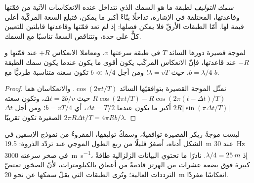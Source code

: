 \begin{definition}\label{def:b3:exploration-seismology:resolution}
\emph{سمك التوليف} لطبقة ما هو السمك
الذي تتداخل عنده الانعكاسات الآتية من قمّتها وقاعدتها، المختلفة في الإشارة،
تداخلًا بنّاءً أكبر ما يمكن، فتبلغ السعة المركّبة أعلى قيمة لها. أمّا الطبقات الأرقّ
فلا يمكن فصلها: إذ لم تعد قمّتها وقاعدتها قابلتين للتعيين كلٌّ على حدة،
وتتناقص السعةُ تناسبًا مع السمك.
\end{definition}

\begin{proposition}\label{prop:b3:exploration-seismology:tuning}
لموجة قصيرة دورها السائد $T$ في طبقة سرعتها $v$، ومعاملا الانعكاس
$+R$ عند قمّتها و$-R$ عند قاعدتها، فإنّ الانعكاس المركّب يكون
أقوى ما يكون عندما يكون سمك الطبقة $b = \lambda/4$، حيث $\lambda = vT$؛ ومن أجل
$b \ll \lambda/4$ تكون سعته متناسبة طرديًّا مع $b$.
\end{proposition}

\begin{proof}
نمثّل الموجة القصيرة بتوافقيّها السائد $\cos(2\pi t/T)$. والانعكاسان
هما $R\cos(2\pi t/T) - R\cos(2\pi(t - \Delta t)/T)$ حيث
$\Delta t = 2b/v$، وتكون سعته $2R|\sin(\pi\Delta t/T)|$ أكبر ما يكون عندما
$\Delta t = T/2$، أي $b = vT/4$؛ ومن أجل $\Delta t$ الصغيرة تكون تقريبًا
$2\pi R\Delta t/T = 4\pi Rb/\lambda$.
\end{proof}

ليست موجةُ ريكر القصيرة توافقيةً، وسمكُ توليفها، المقروءُ من نموذج الإسفين
في الشكل أدناه، أصغرُ قليلًا من ربع الطول الموجي
عند تردّد الذروة: \qty{19.5}{m} عند \qty{30}{Hz} في صخر سرعته
\qty{3000}{m.s^{-1}}، إذ $\lambda/4 = \qty{25}{m}$. نادرًا ما تحتوي البيانات الزلزالية
طاقةً كبيرة فوق بضعة عشرات من الهرتز قادمةً من أعماق بالكيلومترات، لأنّ
الصخور تمتصّ الترددات العالية؛ وتُرى الطبقات التي يقلّ سمكها عن نحو \qty{20}{m}
انعكاسًا مفردًا.

